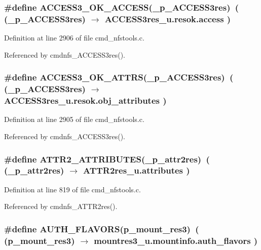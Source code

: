 \subsubsection{\setlength{\rightskip}{0pt plus 5cm}\#define ACCESS3\_\-OK\_\-ACCESS(\_\-p\_\-ACCESS3res)\ ( (\_\-p\_\-ACCESS3res) $\rightarrow$ ACCESS3res\_\-u.resok.access )}\label{cmd__nfstools_8c_a23}




Definition at line 2906 of file cmd\_\-nfstools.c.

Referenced by cmdnfs\_\-ACCESS3res().
\subsubsection{\setlength{\rightskip}{0pt plus 5cm}\#define ACCESS3\_\-OK\_\-ATTRS(\_\-p\_\-ACCESS3res)\ ( (\_\-p\_\-ACCESS3res) $\rightarrow$ ACCESS3res\_\-u.resok.obj\_\-attributes )}\label{cmd__nfstools_8c_a22}




Definition at line 2905 of file cmd\_\-nfstools.c.

Referenced by cmdnfs\_\-ACCESS3res().
\subsubsection{\setlength{\rightskip}{0pt plus 5cm}\#define ATTR2\_\-ATTRIBUTES(\_\-p\_\-attr2res)\ ( (\_\-p\_\-attr2res) $\rightarrow$ ATTR2res\_\-u.attributes )}\label{cmd__nfstools_8c_a4}




Definition at line 819 of file cmd\_\-nfstools.c.

Referenced by cmdnfs\_\-ATTR2res().
\subsubsection{\setlength{\rightskip}{0pt plus 5cm}\#define AUTH\_\-FLAVORS(p\_\-mount\_\-res3)\ ( (p\_\-mount\_\-res3) $\rightarrow$ mountres3\_\-u.mountinfo.auth\_\-flavors )}\label{cmd__nfstools_8c_a3}




